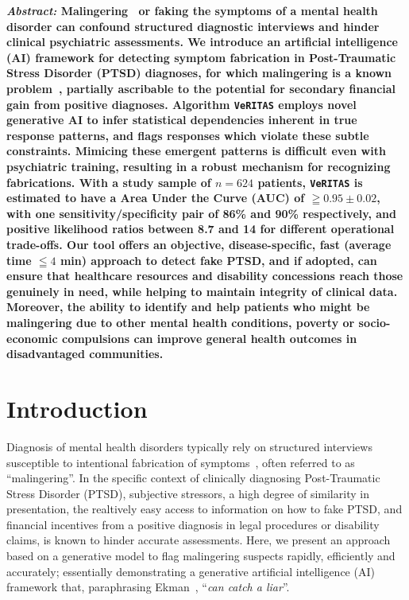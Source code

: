 \documentclass[onecolumn,10pt]{IEEEtran}
\def\vrts{\texttt{VeRITAS}\xspace}
\begin{document}
\maketitle


{\bf \sffamily \fontsize{10}{12}\selectfont \noindent   
  {\normalfont \itshape Abstract:} Malingering~\cite{Rogers1997,rogers2008clinical} or faking  the symptoms of a mental health disorder  can confound structured diagnostic interviews and hinder clinical psychiatric assessments.  We introduce an  artificial intelligence (AI) framework for detecting symptom fabrication in Post-Traumatic Stress Disorder (PTSD) diagnoses, for which malingering is a known problem~\cite{frueh2007us,taylor2007detection}, partially ascribable to the  potential for secondary financial gain from positive diagnoses.  Algorithm \vrts employs novel generative AI to infer statistical dependencies inherent in true response patterns, and flags  responses which violate these subtle  constraints. Mimicing these  emergent  patterns is difficult  even  with psychiatric training, resulting in a robust mechanism for recognizing fabrications. With a study sample of $n=624$ patients, \vrts is estimated to have a   Area Under the Curve (AUC) of $\geqq 0.95\pm 0.02$, with one sensitivity/specificity pair  of 86\% and 90\% respectively, and positive likelihood ratios between 8.7 and 14 for different operational trade-offs. Our tool   offers an  objective, disease-specific, fast (average time $\leqq 4$ min)  approach to detect fake  PTSD, and if adopted, can  ensure that healthcare resources and disability concessions reach  those genuinely in need,  while  helping to maintain  integrity of clinical data. Moreover, the ability to identify and help  patients who might be malingering due to other mental health conditions, poverty or   socio-economic compulsions can  improve general health outcomes  in disadvantaged communities.  
}



\vspace{10pt} 

\section*{Introduction}
Diagnosis of mental health disorders typically  rely  on structured interviews~\cite{ali2015multimodal} susceptible to  intentional fabrication of  symptoms~\cite{Rogers1997,rogers2008clinical}, often referred to as ``malingering''. In the specific context of clinically diagnosing Post-Traumatic Stress Disorder (PTSD),  subjective stressors, a high degree of similarity in presentation,  the realtively easy access to  information on  how to fake PTSD,  and financial  incentives from a positive diagnosis  in  legal procedures or   disability claims, is known to hinder   accurate   assessments. Here, we present an approach based on a  generative model to flag malingering suspects rapidly, efficiently and accurately; essentially demonstrating a generative artificial intelligence (AI) framework that, paraphrasing Ekman~\cite{Ekman1992},  ``\textit{can catch a liar}''. 
\end{document}
